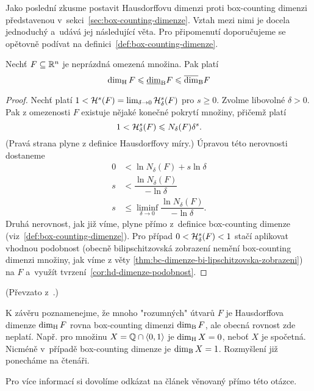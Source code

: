 Jako poslední zkusme postavit Hausdorffovu dimenzi proti box-counting dimenzi představenou v~sekci~\ref{sec:box-counting-dimenze}. Vztah mezi nimi je docela jednoduchý a~udává jej následující věta. Pro připomenutí doporučujeme se opětovně podívat na definici~\ref{def:box-counting-dimenze}.
\begin{theorem}\label{thm:bc-dimenze-vs-hd-dimenze}
    Nechť $F\subseteq\mathbb{R}^n$ je neprázdná omezená množina. Pak platí
    \[\operatorname{dim_H}{F}\leqslant\underline{\dim}_\textup{B}{F}\leqslant\overline{\dim}_\textup{B}{F}\]
\end{theorem}
\begin{proof}
    Nechť platí $1<\mathcal{H}^{s}(F)=\lim_{\delta\to 0}\mathcal{H}_{\delta}^{s}(F)$ pro $s\geqslant 0$. Zvolme libovolné $\delta>0$. Pak z omezenosti $F$ existuje nějaké konečné pokrytí množiny, přičemž platí
    \[1<\mathcal{H}_{\delta}^{s}(F)\leqslant N_\delta(F)\delta^s.\]
    (Pravá strana plyne z definice Hausdorffovy míry.) Úpravou této nerovnosti dostaneme
    \begin{align*}
        0&<\ln{N_\delta(F)}+s\ln{\delta}\\
        s&<\dfrac{\ln{N_\delta(F)}}{-\ln{\delta}}\\
        s&\leqslant\liminf_{\delta\to 0}\dfrac{\ln{N_\delta(F)}}{-\ln{\delta}}.
    \end{align*}
    Druhá nerovnost, jak již víme, plyne přímo z~definice box-counting dimenze (viz~\ref{def:box-counting-dimenze}). Pro případ $0<\mathcal{H}_{\delta}^{s}(F)<1$ stačí aplikovat vhodnou podobnost (obecně bilipschitzovská zobrazení nemění box-counting dimenzi množiny, jak víme z věty \ref{thm:bc-dimenze-bi-lipschitzovska-zobrazeni}) na $F$ a~využít tvrzení~\ref{cor:hd-dimenze-podobnost}.
\end{proof}
(Převzato z~\citep[str. 50]{Falconer2014}.)

K závěru poznamenejme, že mnoho "rozumných" útvarů $F$ je Hausdorffova dimenze $\operatorname{dim_H}{F}$ rovna box-counting dimenzi $\operatorname{dim_B}{F}$, ale obecná rovnost zde neplatí. Např. pro množinu $X=\mathbb{Q}\cap\langle0,1\rangle$ je $\operatorname{dim_H}{X}=0$, neboť $X$ je spočetná. Nicméně v~případě box-counting dimenze je $\operatorname{dim_B}{X}=1$. Rozmyšlení již ponecháme na čtenáři.

Pro více informací si dovolíme odkázat na článek \cite{Falconer1989} věnovaný přímo této otázce.